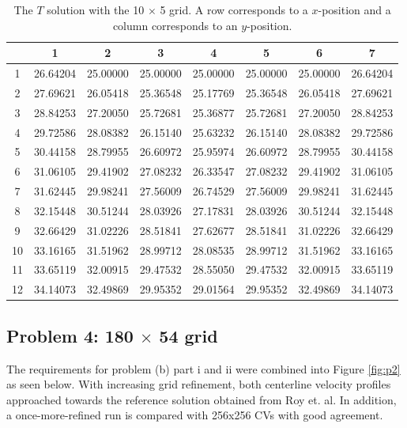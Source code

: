 \documentclass{article}
\begin{document}
\def\arraystretch{1.3}
\begin{table}[H]
	\scriptsize
	\centering
	\caption{The $T$ solution with the 10 $\times$ 5 grid. A row corresponds to a $x$-position and a column corresponds to an $y$-position.}
	\vspace{0.2cm}
	\begin{tabular}{c|S|S|S|S|S|S|S}
		& {1} & {2} & {3} & {4} & {5} & {6} & {7} \\
		 & 26.64204 & 25.00000 & 25.00000 & 25.00000 & 25.00000 & 25.00000 & 26.64204 \\
		2 & 27.69621 & 26.05418 & 25.36548 & 25.17769 & 25.36548 & 26.05418 & 27.69621 \\
		3 & 28.84253 & 27.20050 & 25.72681 & 25.36877 & 25.72681 & 27.20050 & 28.84253 \\
		4 & 29.72586 & 28.08382 & 26.15140 & 25.63232 & 26.15140 & 28.08382 & 29.72586 \\
		5 & 30.44158 & 28.79955 & 26.60972 & 25.95974 & 26.60972 & 28.79955 & 30.44158 \\
		6 & 31.06105 & 29.41902 & 27.08232 & 26.33547 & 27.08232 & 29.41902 & 31.06105 \\
		7 & 31.62445 & 29.98241 & 27.56009 & 26.74529 & 27.56009 & 29.98241 & 31.62445 \\
		8 & 32.15448 & 30.51244 & 28.03926 & 27.17831 & 28.03926 & 30.51244 & 32.15448 \\
		9 & 32.66429 & 31.02226 & 28.51841 & 27.62677 & 28.51841 & 31.02226 & 32.66429 \\
		10 & 33.16165 & 31.51962 & 28.99712 & 28.08535 & 28.99712 & 31.51962 & 33.16165 \\
		11 & 33.65119 & 32.00915 & 29.47532 & 28.55050 & 29.47532 & 32.00915 & 33.65119 \\
		12 & 34.14073 & 32.49869 & 29.95352 & 29.01564 & 29.95352 & 32.49869 & 34.14073 \\
	\end{tabular}
	\label{table:coarse-T}
\end{table}

\subsection{Problem 4: 180 $\times$ 54 grid}

The requirements for problem (b) part i and ii were combined into Figure \ref{fig:p2} as seen below. With increasing grid refinement, both centerline velocity profiles approached towards the reference solution obtained from Roy et. al. In addition, a once-more-refined run is compared with 256x256 CVs with good agreement.
\end{document}
